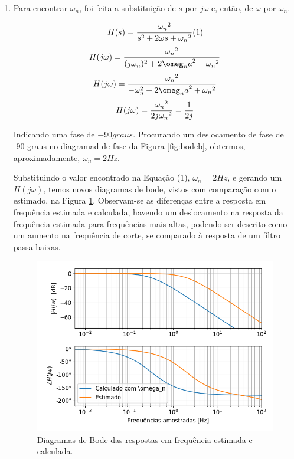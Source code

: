 \documentclass[12pt,letterpaper]{article}
\begin{document}
\begin{enumerate}[label=(\alph*)]
    \item
    Para encontrar $\omega_n$, foi feita a substituição de $s$ por $j\omega$ e, então, de $\omega$ por $\omega_n$.
    
    $$
    H(s) = {{\omega_n}^2 \over {s^2 + 2\omega s + {\omega_n}^2}     }  (1)
    $$
    $$
    H(j\omega) = {{\omega_n}^2 \over {(j\omega_n)^2 + 2{\omeg_na}^2  + {\omega_n}^2}     }
    $$
    $$
    H(j\omega) = {{\omega_n}^2 \over {-\omega_n^2 + 2{\omeg_na}^2  + {\omega_n}^2}     }
    $$
    $$
    H(j\omega) = {{\omega_n}^2 \over {2j{\omega_n}^2} } = {1 \over 2j}
    $$
    
    Indicando uma fase de $-90 graus$. Procurando um deslocamento de fase de -90 graus no diagramad de fase da Figura \ref{fig:bodeb}, obtermos, aproximadamente, $\omega_n = 2Hz$.
    
    Substituindo o valor encontrado na Equação (1), $\omega_n = 2Hz$, e gerando um $H(j \omega)$, temos novos diagramas de bode, vistos com comparação com o estimado, na Figura \ref{fig:bodec}. Observam-se as diferenças entre a resposta em frequência estimada e calculada, havendo um deslocamento na resposta da frequência estimada para frequências mais altas, podendo ser descrito como um aumento na frequência de corte, se comparado à resposta de um filtro passa baixas.
    
            \begin{figure}[H]
            \centering
            \includegraphics[width=15cm]{TC2/images/bodec.png}
            \caption{Diagramas de Bode das respostas em frequência estimada e calculada.}
            \label{fig:bodec}
        \end{figure}
    
\end{enumerate}





\end{document}
